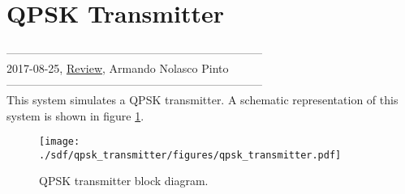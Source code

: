 \section{QPSK Transmitter}

--------------------------------------------------------------------\\
2017-08-25, \underline{Review}, Armando Nolasco Pinto\\
--------------------------------------------------------------------\\

This system simulates a QPSK transmitter. A schematic representation of this system is shown in figure \ref{QPSK_transmitter_block_diagram_simple}.

\begin{figure}[h]
	\centering
	\texttt{[image: ./sdf/qpsk\_transmitter/figures/qpsk\_transmitter.pdf]}
	\caption{QPSK transmitter block diagram.}\label{QPSK_transmitter_block_diagram_simple}
\end{figure}

